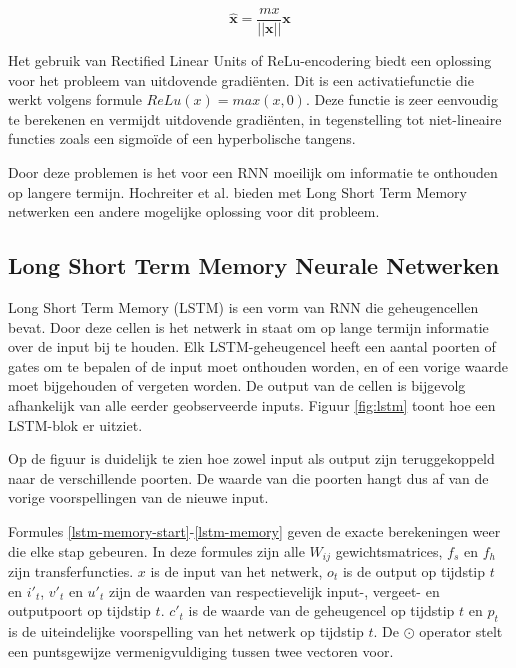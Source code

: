 \begin{equation}
    \mathbf{\hat{x}} = \frac{mx}{||\mathbf{x}||}\mathbf{x}
\end{equation}

Het gebruik van Rectified Linear Units of ReLu-encodering biedt een oplossing voor het probleem van uitdovende gradi\"enten. Dit is een activatiefunctie die werkt volgens formule $ReLu(x) = max(x,0)$. Deze functie is zeer eenvoudig te berekenen en vermijdt uitdovende gradi\"enten, in tegenstelling tot niet-lineaire functies zoals een sigmo\"ide of een hyperbolische tangens\cite{Glorot2011}.

Door deze problemen is het voor een RNN moeilijk om informatie te onthouden op langere termijn. Hochreiter et al.\cite{SeppHochreiter1997} bieden met Long Short Term Memory netwerken een andere mogelijke oplossing voor dit probleem.

\subsection{Long Short Term Memory Neurale Netwerken}
\label{sub:lstm}
Long Short Term Memory (LSTM) is een vorm van RNN die geheugencellen bevat. Door deze cellen is het netwerk in staat om op lange termijn informatie over de input bij te houden. Elk LSTM-geheugencel heeft een aantal poorten of gates om te bepalen of de input moet onthouden worden, en of een vorige waarde moet bijgehouden of vergeten worden. De output van de cellen is bijgevolg afhankelijk van alle eerder geobserveerde inputs. Figuur \ref{fig:lstm} toont hoe een LSTM-blok er uitziet.\cite{SeppHochreiter1997,Google}

Op de figuur is duidelijk te zien hoe zowel input als output zijn teruggekoppeld naar de verschillende poorten. De waarde van die poorten hangt dus af van de vorige voorspellingen van de nieuwe input.

Formules \eqref{lstm-memory-start}-\eqref{lstm-memory} geven de exacte berekeningen weer die elke stap gebeuren. In deze formules zijn alle $W_{ij}$ gewichtsmatrices, $f_s$ en $f_h$ zijn transferfuncties. $x$ is de input van het netwerk, $o_t$ is de output op tijdstip $t$ en $i'_t$, $v'_t$ en $u'_t$ zijn de waarden van respectievelijk input-, vergeet- en outputpoort op tijdstip $t$. $c'_t$ is de waarde van de geheugencel op tijdstip $t$ en $p_t$ is de uiteindelijke voorspelling van het netwerk op tijdstip $t$. De $\odot$ operator stelt een puntsgewijze vermenigvuldiging tussen twee vectoren voor.


